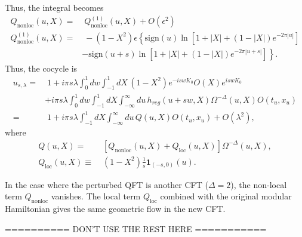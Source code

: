 \documentclass[a4paper,11pt]{article}
\theoremstyle{definition}
\begin{document}
Thus, the integral becomes
\begin{align}
    Q_{\text{nonloc}}(u,X) =&\; Q^{(1)}_{\text{nonloc}}(u,X) + O(\epsilon^2)\\
    Q^{(1)}_{\text{nonloc}}(u,X) =&\; -(1-X^2)\epsilon\left\{ \text{sign}(u)\ln\left[1+|X| +(1-|X|)e^{-2\pi|u|}\right] \right. \nonumber\\
    & \left.- \text{sign}(u+s)\ln\left[1+|X| +(1-|X|)e^{-2\pi|u+s|}\right] \right\}.
\end{align}
Thus, the cocycle is 
\begin{align}
    u_{s,\lambda}=&\; 1 + i\pi s\lambda\int_0^1 dw  \int_{-1}^1 dX \, (1-X^2)e^{-iswK_0} O(X) e^{iswK_0} \nonumber\\
    &+ i\pi s\lambda\int_0^1 dw  \int_{-1}^1 dX \int_{-\infty}^{\infty} du \, h_{reg}(u+sw,X) \Omega^{-\Delta}(u,X)O(t_u,x_u)\\
    =&\; 1 + i\pi s\lambda \int_{-1}^1 dX \int_{-\infty}^{\infty} du \, Q(u,X)O(t_u,x_u) +O(\lambda^2),
\end{align}
where 
\begin{align}
    Q(u,X) =&\; \left[Q_{\text{nonloc}}(u,X) + Q_{\text{loc}}(u,X) \right]\Omega^{-\Delta}(u,X), \\
    Q_{\text{loc}}(u,X) \equiv &\; (1-X^2)\frac{1}{s} \textbf{1}_{(-s,0)}(u).
\end{align}

In the case where the perturbed QFT is another CFT ($\Delta = 2$), the non-local term $Q_{\text{nonloc}}$ vanishes. The local term $Q_\text{loc}$ combined with the original modular Hamiltonian gives the same geometric flow in the new CFT. 

========== DON'T USE THE REST HERE ===========
\end{document}
